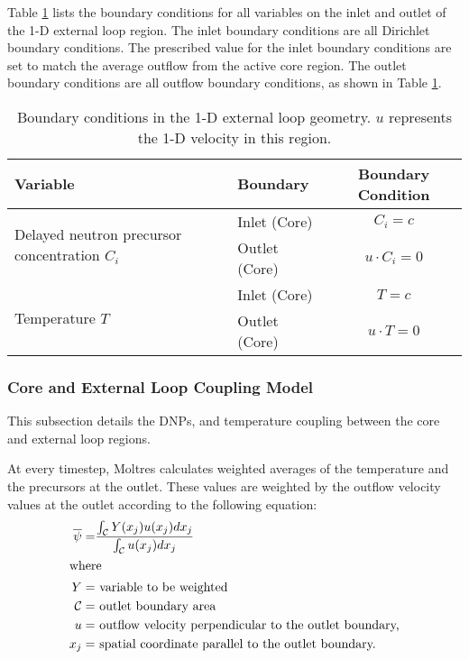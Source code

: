 Table \ref{table:loopbc} lists the boundary conditions for all variables on the inlet and outlet of
the 1-D external loop region. The inlet boundary conditions are all Dirichlet boundary conditions. The
prescribed value for the inlet boundary conditions are set to match the average outflow from the
active core region. The outlet boundary conditions are all outflow boundary conditions, as shown in
Table \ref{table:loopbc}.

\begin{table}[htbp!]
    \small
	\caption{Boundary conditions in the 1-D external loop geometry. $u$
	represents the 1-D velocity in this region.}
	\centering
	\begin{tabular}{ l l c}
		\toprule
		Variable & Boundary & Boundary Condition \\
        \midrule
        \multirow{2}{*}{Delayed neutron precursor concentration $C_i$} &
        Inlet (Core) & $C_i = c$ \\
        & Outlet (Core) & $u \cdot C_i = 0$ \\
        \midrule
        \multirow{2}{*}{Temperature $T$} &
        Inlet (Core) & $T = c$ \\
        & Outlet (Core) & $u \cdot T = 0$ \\
		\bottomrule
	\end{tabular}
	\label{table:loopbc}
\end{table}

\subsubsection{Core and External Loop Coupling Model}

This subsection details the \glspl{DNP}, and
temperature coupling between the core and external loop regions. 

At every timestep, Moltres calculates weighted averages of the
temperature and the precursors at the outlet. These values are weighted by the
outflow velocity values at the outlet according to the following equation:
%
\begin{align}
    \overline{\psi} =& \frac{\int_\mathcal{C} Y(x_j) u(x_j) dx_j}{
    \int_\mathcal{C} u(x_j) dx_j} \\
    \shortintertext{where}
    Y =& \text{ variable to be weighted} \nonumber \\
    \mathcal{C} =& \text{ outlet boundary area} \nonumber \\
    u =& \text{ outflow velocity perpendicular to the outlet boundary,} \nonumber \\
    x_j =& \text{ spatial coordinate parallel to the outlet boundary.}
    \nonumber
\end{align}

